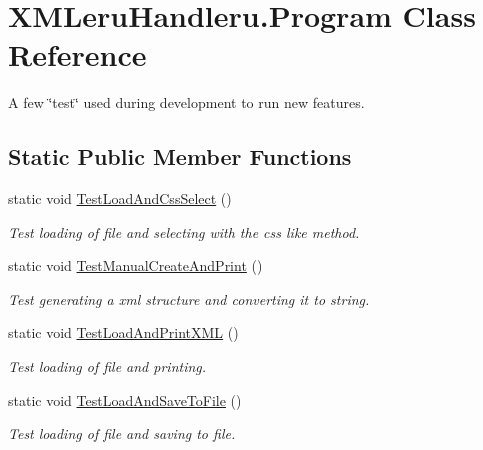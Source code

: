 \hypertarget{class_x_m_leru_handleru_1_1_program}{}\section{X\+M\+Leru\+Handleru.\+Program Class Reference}
\label{class_x_m_leru_handleru_1_1_program}


A few \char`\"{}test\char`\"{} used during development to run new features.  


\subsection*{Static Public Member Functions}
\begin{DoxyCompactItemize}
\item 
\hypertarget{class_x_m_leru_handleru_1_1_program_a1b5db7be6e3f46788ffb6724f4ad9cdf}{}static void \hyperlink{class_x_m_leru_handleru_1_1_program_a1b5db7be6e3f46788ffb6724f4ad9cdf}{Test\+Load\+And\+Css\+Select} ()\label{class_x_m_leru_handleru_1_1_program_a1b5db7be6e3f46788ffb6724f4ad9cdf}

\begin{DoxyCompactList}\small\item\em Test loading of file and selecting with the css like method. \end{DoxyCompactList}\item 
\hypertarget{class_x_m_leru_handleru_1_1_program_a1fac06cc0ab95a39af3c262ae2152739}{}static void \hyperlink{class_x_m_leru_handleru_1_1_program_a1fac06cc0ab95a39af3c262ae2152739}{Test\+Manual\+Create\+And\+Print} ()\label{class_x_m_leru_handleru_1_1_program_a1fac06cc0ab95a39af3c262ae2152739}

\begin{DoxyCompactList}\small\item\em Test generating a xml structure and converting it to string. \end{DoxyCompactList}\item 
\hypertarget{class_x_m_leru_handleru_1_1_program_a46277b5cc2e1f90abc6072dbf7b3bd28}{}static void \hyperlink{class_x_m_leru_handleru_1_1_program_a46277b5cc2e1f90abc6072dbf7b3bd28}{Test\+Load\+And\+Print\+X\+M\+L} ()\label{class_x_m_leru_handleru_1_1_program_a46277b5cc2e1f90abc6072dbf7b3bd28}

\begin{DoxyCompactList}\small\item\em Test loading of file and printing. \end{DoxyCompactList}\item 
\hypertarget{class_x_m_leru_handleru_1_1_program_a928ffe04f368b42de64fd208a2b2548d}{}static void \hyperlink{class_x_m_leru_handleru_1_1_program_a928ffe04f368b42de64fd208a2b2548d}{Test\+Load\+And\+Save\+To\+File} ()\label{class_x_m_leru_handleru_1_1_program_a928ffe04f368b42de64fd208a2b2548d}

\begin{DoxyCompactList}\small\item\em Test loading of file and saving to file. \end{DoxyCompactList}\end{DoxyCompactItemize}
